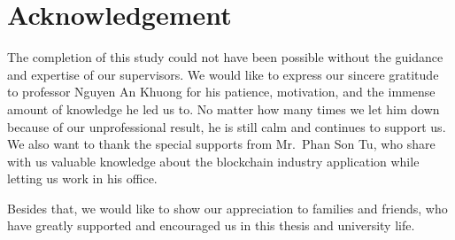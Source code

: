 \chapter*{Acknowledgement}
\thispagestyle{empty}
\label{Acknowledgement}
\hspace*{5cm}

The completion of this study could not have been possible without the guidance and expertise of our supervisors. We would like to express our sincere gratitude to professor Nguyen An Khuong for his patience, motivation, and the immense amount of knowledge he led us to. No matter how many times we let him down because of our unprofessional result, he is still calm and continues to support us. We also want to thank the special supports from Mr.~Phan Son Tu, who share with us valuable knowledge about the blockchain industry application while letting us work in his office.

Besides that, we would like to show our appreciation to families and friends, who have greatly supported and encouraged us in this thesis and university life.


\cleardoublepage